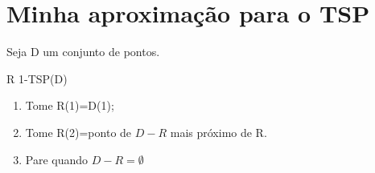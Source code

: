 \documentclass[a4paper, 12pt]{article}
\begin{document}
\section{Minha aproximação para o TSP}

 Seja D um conjunto de pontos.

R 1-TSP(D)
\begin{enumerate}
\item Tome R(1)=D(1);
\item Tome R(2)=ponto de $D-R$ mais próximo de R.
\item Pare quando $D-R=\emptyset$
\end{enumerate}
\end{document}
